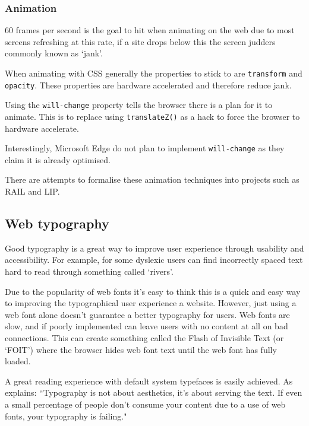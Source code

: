 \subsubsection{Animation} \label{l-r--animation}

60 frames per second is the goal to hit when animating on the web due to most screens refreshing at this rate, if a site drops below this the screen judders commonly known as `jank'. \cite{jank}

When animating with CSS generally the properties to stick to are \verb|transform| and \verb|opacity|. These properties are hardware accelerated and therefore reduce jank. \cite{high_perf_animations} \cite{css_triggers}

Using the \verb|will-change| property tells the browser there is a plan for it to animate. This is to replace using \verb|translateZ()| as a hack to force the browser to hardware accelerate. \cite{animations_and_performance}

Interestingly, Microsoft Edge do not plan to implement \verb|will-change| as they claim it is already optimised. \cite{will_change_edge}

There are attempts to formalise these animation techniques into projects such as RAIL and LIP. \cite{introducing_RAIL} \cite{FLIP}

\subsection{Web typography} \label{l-r--web-type}

Good typography is a great way to improve user experience through usability and accessibility. For example, for some dyslexic users can find incorrectly spaced text hard to read through something called `rivers'. \cite{dyslexia}

Due to the popularity of web fonts it's easy to think this is a quick and easy way to improving the typographical user experience a website. However, just using a web font alone doesn't guarantee a better typography for users. Web fonts are slow, and if poorly implemented can leave users with no content at all on bad connections. This can create something called the Flash of Invisible Text (or `FOIT') where the browser hides web font text until the web font has fully loaded. \cite{FOIT}

A great reading experience with default system typefaces is easily achieved. As \cite{against_webfonts} explains: ``Typography is not about aesthetics, it's about serving the text. If even a small percentage of people don't consume your content due to a use of web fonts, your typography is failing."

